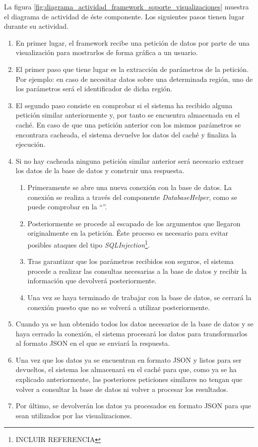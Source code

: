La figura \ref{fig:diagrama_actividad_framework_soporte_visualizaciones} muestra el diagrama de actividad de éste componente.  Los siguientes pasos tienen lugar durante su actividad.
\begin{enumerate}
	\item  En primer lugar, el framework recibe una petición de datos por parte de una visualización para mostrarlos de forma gráfica a un usuario.
	\item  El primer paso que tiene lugar es la extracción de parámetros de la petición.  Por ejemplo: en caso de necesitar datos sobre una determinada región, uno de los parámetros será el identificador de dicha región.
	\item  El segundo paso consiste en comprobar si el sistema ha recibido alguna petición similar anteriormente y, por tanto se encuentra almacenada en el caché.  En caso de que una petición anterior con los mismos parámetros se encontrara cacheada, el sistema devuelve los datos del caché y finaliza la ejecución.
	\item  Si no hay cacheada ninguna petición similar anterior será necesario extraer los datos de la base de datos y construir una respuesta.
		\begin{enumerate}
			\item  Primeramente se abre una nueva conexión con la base de datos.  La conexión se realiza a través del componente \textit{DatabaseHelper}, como se puede comprobar en la ``''.
			\item  Posteriormente se procede al escapado de los argumentos que llegaron originalmente en la petición.  Éste proceso es necesario para evitar posibles ataques del tipo \textit{SQLInjection}\footnote{INCLUIR REFERENCIA}.
			\item  Tras garantizar que los parámetros recibidos son seguros, el sistema procede a realizar las consultas necesarias a la base de datos y recibir la información que devolverá posteriormente.
			\item  Una vez se haya terminado de trabajar con la base de datos, se cerrará la conexión puesto que no se volverá a utilizar posteriormente.
		\end{enumerate}
	\item  Cuando ya se han obtenido todos los datos necesarios de la base de datos y se haya cerrado la conexión, el sistema procesará los datos para transformarlos al formato JSON en el que se enviará la respuesta.
	\item  Una vez que los datos ya se encuentran en formato JSON y listos para ser devueltos, el sistema los almacenará en el caché para que, como ya se ha explicado anteriormente, las posteriores peticiones similares no tengan que volver a consultar la base de datos ni volver a procesar los resultados.
	\item  Por último, se devolverán los datos ya procesados en formato JSON para que sean utilizados por las visualizaciones.
\end{enumerate}
